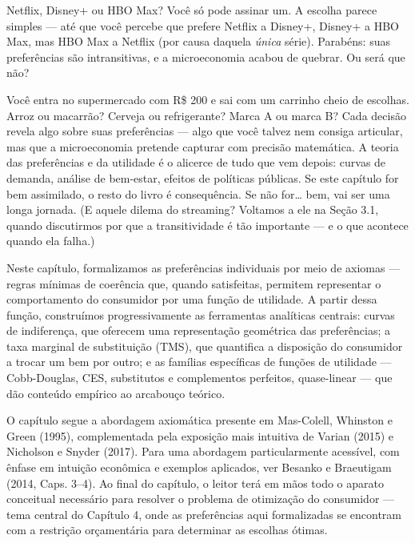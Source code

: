 \documentclass[11pt,twoside,openright]{book}
\begin{document}
Netflix, Disney+ ou HBO Max? Você só pode assinar um. A escolha parece
simples --- até que você percebe que prefere Netflix a Disney+, Disney+
a HBO Max, mas HBO Max a Netflix (por causa daquela \emph{única} série).
Parabéns: suas preferências são intransitivas, e a microeconomia acabou
de quebrar. Ou será que não?

Você entra no supermercado com R\$ 200 e sai com um carrinho cheio de
escolhas. Arroz ou macarrão? Cerveja ou refrigerante? Marca A ou marca
B? Cada decisão revela algo sobre suas preferências --- algo que você
talvez nem consiga articular, mas que a microeconomia pretende capturar
com precisão matemática. A teoria das preferências e da utilidade é o
alicerce de tudo que vem depois: curvas de demanda, análise de
bem-estar, efeitos de políticas públicas. Se este capítulo for bem
assimilado, o resto do livro é consequência. Se não for\ldots{} bem, vai
ser uma longa jornada. (E aquele dilema do streaming? Voltamos a ele na
Seção 3.1, quando discutirmos por que a transitividade é tão importante
--- e o que acontece quando ela falha.)

Neste capítulo, formalizamos as preferências individuais por meio de
axiomas --- regras mínimas de coerência que, quando satisfeitas,
permitem representar o comportamento do consumidor por uma função de
utilidade. A partir dessa função, construímos progressivamente as
ferramentas analíticas centrais: curvas de indiferença, que oferecem uma
representação geométrica das preferências; a taxa marginal de
substituição (TMS), que quantifica a disposição do consumidor a trocar
um bem por outro; e as famílias específicas de funções de utilidade ---
Cobb-Douglas, CES, substitutos e complementos perfeitos, quase-linear
--- que dão conteúdo empírico ao arcabouço teórico.

O capítulo segue a abordagem axiomática presente em Mas-Colell, Whinston
e Green (1995), complementada pela exposição mais intuitiva de Varian
(2015) e Nicholson e Snyder (2017). Para uma abordagem particularmente
acessível, com ênfase em intuição econômica e exemplos aplicados, ver
Besanko e Braeutigam (2014, Caps. 3--4). Ao final do capítulo, o leitor
terá em mãos todo o aparato conceitual necessário para resolver o
problema de otimização do consumidor --- tema central do Capítulo 4,
onde as preferências aqui formalizadas se encontram com a restrição
orçamentária para determinar as escolhas ótimas.
\end{document}
